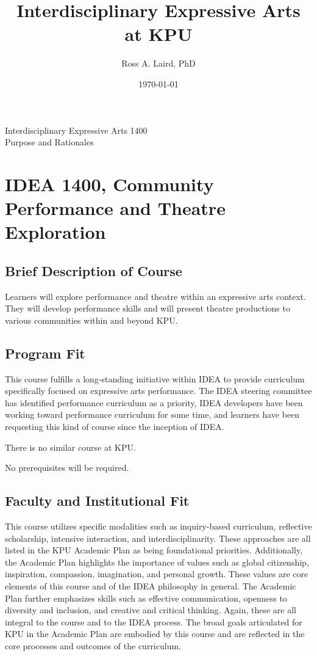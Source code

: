 \documentclass[letterpaper,10pt,headsepline]{scrreprt}
\author{Ross A. Laird, PhD}
\title{Interdisciplinary Expressive Arts\\ at KPU}
\date{\today}
\begin{document}
\pagestyle{empty}
\vspace*{7em} 
\begin{center}
\huge{Interdisciplinary Expressive Arts 1400}\\
\vspace*{1em} 
\large{Purpose and  Rationales}
\end{center}
\clearpage
\pagestyle{scrheadings}

\section{IDEA 1400, Community Performance and Theatre Exploration}

\subsection{Brief Description of Course}

Learners will explore performance and theatre within an expressive arts
context. They will develop performance skills and will present theatre
productions to various communities within and beyond KPU.

\subsection{Program Fit}

This course fulfills a long-standing initiative within IDEA to provide
curriculum specifically focused on expressive arts performance. The IDEA
steering committee has identified performance curriculum as a priority,
IDEA developers have been working toward performance curriculum for some
time, and learners have been requesting this kind of course since the
inception of IDEA.

There is no similar course at KPU.

No prerequisites will be required.

\subsection{Faculty and Institutional Fit}

This course utilizes specific modalities such as inquiry-based
curriculum, reflective scholarship, intensive interaction, and
interdisciplinarity. These approaches are all listed in the KPU Academic
Plan as being foundational priorities. Additionally, the Academic Plan
highlights the importance of values such as global citizenship,
inspiration, compassion, imagination, and personal growth. These values
are core elements of this course and of the IDEA philosophy in general.
The Academic Plan further emphasizes skills such as effective
communication, openness to diversity and inclusion, and creative and
critical thinking. Again, these are all integral to the course and to
the IDEA process. The broad goals articulated for KPU in the Academic
Plan are embodied by this course and are reflected in the core processes
and outcomes of the curriculum.
\end{document}
